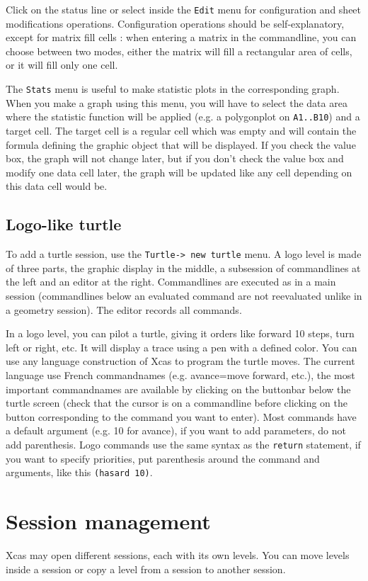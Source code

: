 \documentclass{article}
\begin{document}
Click on the status line or select inside the \verb|Edit| menu
for configuration and sheet modifications operations. Configuration
operations should be self-explanatory, except for matrix fill cells : 
when entering a matrix in the commandline, 
you can choose between two modes, either the matrix will fill
a rectangular area of cells, or it will fill only one cell.

The \verb|Stats|
menu is useful to make statistic plots in the corresponding graph.
When you make a graph using this menu, you will have to select
the data area where the statistic function will be applied (e.g.
a polygonplot on \verb|A1..B10|) and a target cell. The target
cell is a regular cell which was empty and will contain the formula
defining the graphic object that will be displayed. If you check the
value box, the graph will not change later, but if you don't check
the value box and modify
one data cell later, the graph will be updated like any cell 
depending on this data cell would be.

\subsection{Logo-like turtle}
To add a turtle session, use the \verb|Turtle-> new turtle| menu.
A logo level is made of three parts, the graphic display 
in the middle, a subsession of commandlines at the left
and an editor at the right. Commandlines are executed as in
a main session (commandlines below an evaluated command
are not reevaluated unlike in a geometry session). The editor
records all commands.

In a logo level, you can pilot a turtle, giving it orders like forward
10 steps, turn left or right, etc. It will display a trace
using a pen with a defined color. 
You can use any language construction of Xcas to program the
turtle moves. The current language use French commandnames
(e.g. avance=move forward, etc.), the most important commandnames
are available by clicking on the buttonbar below the turtle screen
(check that the cursor is on a commandline before clicking on
the button corresponding to the command you want to enter).
Most commands have a default argument (e.g. 10 for avance),
if you want to add parameters, do not add parenthesis. Logo
commands use the same syntax as the \verb|return| statement,
if you want to specify priorities, put parenthesis around
the command and arguments, like this \verb|(hasard 10)|.

\section{Session management}
Xcas may open different sessions, each with its own levels.
You can move levels inside a session or copy a level from a 
session to another session.
\end{document}
